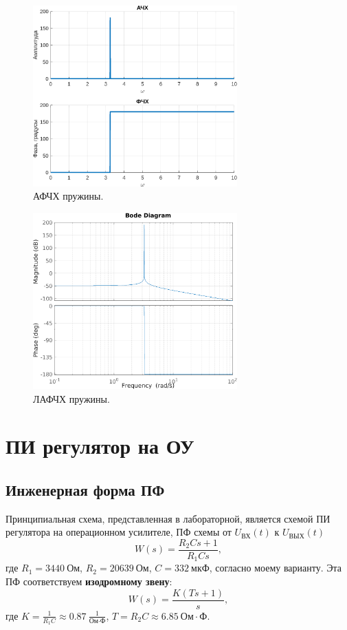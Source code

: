 \begin{figure}[H]
    \centering
    \includegraphics[width=0.7\textwidth]{figs/task_4_АФЧХ.png}
    \caption{АФЧХ пружины.}
    \label{fig:task_4_АФЧХ}
\end{figure}

\begin{figure}[H]
    \centering
    \includegraphics[width=0.7\textwidth]{figs/task_4_ЛАФЧХ.png}
    \caption{ЛАФЧХ пружины.}
    \label{fig:task_4_ЛАФЧХ}
\end{figure}


\section{ПИ регулятор на ОУ}

\subsection{Инженерная форма ПФ}

Принципиальная схема, представленная в лабораторной, является схемой ПИ регулятора на
операционном усилителе, ПФ схемы от $U_\text{ВХ}(t)$ к $U_\text{ВЫХ}(t)$
\begin{equation*}
    W(s)=\frac{R_2Cs+1}{R_1Cs},
\end{equation*}
где $R_1=3440\ \text{Ом}$, $R_2=20639\ \text{Ом}$, $C=332\ \text{мкФ}$,
согласно моему варианту. Эта ПФ соответствуем \textbf{изодромному звену}:
\begin{equation*}
    W(s)=\frac{K(Ts+1)}{s},
\end{equation*}
где $K=\frac{1}{R_1C}\approx0.87\ \frac{1}{\text{Ом}\cdot\text{Ф}}$,
$T=R_2C\approx6.85\ \text{Ом}\cdot\text{Ф}$.

